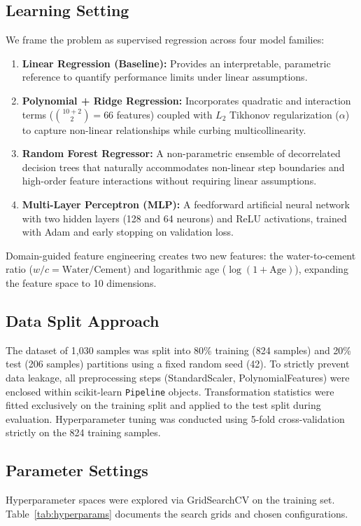 \documentclass[conference]{IEEEtran}
\begin{document}
\subsection{Learning Setting}
We frame the problem as supervised regression across four model families:
\begin{enumerate}
    \item \textbf{Linear Regression (Baseline):} Provides an interpretable, parametric reference to quantify performance limits under linear assumptions.
    \item \textbf{Polynomial + Ridge Regression:} Incorporates quadratic and interaction terms ($\binom{10+2}{2} = 66$ features) coupled with $L_2$ Tikhonov regularization ($\alpha$) to capture non-linear relationships while curbing multicollinearity.
    \item \textbf{Random Forest Regressor:} A non-parametric ensemble of decorrelated decision trees that naturally accommodates non-linear step boundaries and high-order feature interactions without requiring linear assumptions.
    \item \textbf{Multi-Layer Perceptron (MLP):} A feedforward artificial neural network with two hidden layers (128 and 64 neurons) and ReLU activations, trained with Adam and early stopping on validation loss.
\end{enumerate}

Domain-guided feature engineering creates two new features: the water-to-cement ratio ($w/c = \text{Water}/\text{Cement}$) and logarithmic age ($\log(1+\text{Age})$), expanding the feature space to 10 dimensions.

\subsection{Data Split Approach}
The dataset of 1,030 samples was split into 80\% training (824 samples) and 20\% test (206 samples) partitions using a fixed random seed (42). To strictly prevent data leakage, all preprocessing steps (StandardScaler, PolynomialFeatures) were enclosed within scikit-learn \texttt{Pipeline} objects. Transformation statistics were fitted exclusively on the training split and applied to the test split during evaluation. Hyperparameter tuning was conducted using 5-fold cross-validation strictly on the 824 training samples.

\subsection{Parameter Settings}
Hyperparameter spaces were explored via GridSearchCV on the training set. Table~\ref{tab:hyperparams} documents the search grids and chosen configurations.
\end{document}
